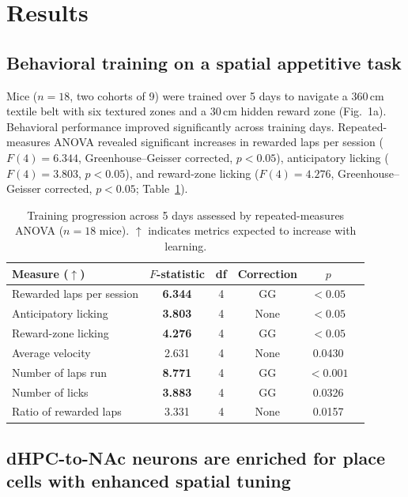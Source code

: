 \documentclass[11pt]{article}
\begin{document}
\section{Results}

\subsection{Behavioral training on a spatial appetitive task}

Mice ($n=18$, two cohorts of 9) were trained over 5 days to navigate a 360\,cm textile belt with six textured zones and a 30\,cm hidden reward zone (Fig.~1a). Behavioral performance improved significantly across training days. Repeated-measures ANOVA revealed significant increases in rewarded laps per session ($F(4)=6.344$, Greenhouse--Geisser corrected, $p<0.05$), anticipatory licking ($F(4)=3.803$, $p<0.05$), and reward-zone licking ($F(4)=4.276$, Greenhouse--Geisser corrected, $p<0.05$; Table~\ref{tab:training}).

\begin{table}[H]
\centering
\caption{Training progression across 5 days assessed by repeated-measures ANOVA ($n=18$ mice).
$\uparrow$ indicates metrics expected to increase with learning.}
\label{tab:training}
\begin{tabular}{lccccc}
\toprule
Measure ($\uparrow$) & $F$-statistic & df & Correction & $p$ \\
\midrule
Rewarded laps per session & \textbf{6.344} & 4 & GG & $<0.05$ \\
Anticipatory licking & \textbf{3.803} & 4 & None & $<0.05$ \\
Reward-zone licking & \textbf{4.276} & 4 & GG & $<0.05$ \\
Average velocity & 2.631 & 4 & None & 0.0430 \\
Number of laps run & \textbf{8.771} & 4 & GG & $<0.001$ \\
Number of licks & \textbf{3.883} & 4 & GG & 0.0326 \\
Ratio of rewarded laps & 3.331 & 4 & None & 0.0157 \\
\bottomrule
\end{tabular}
\end{table}

\subsection{dHPC-to-NAc neurons are enriched for place cells with enhanced spatial tuning}
\end{document}
